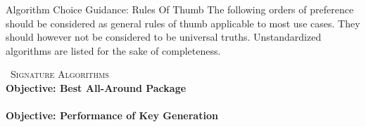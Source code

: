 


\begin{minipage}[t]{0.7\textwidth}
    \vspace{0pt}
    \begin{algorithmbox}{Algorithm Choice Guidance: Rules Of Thumb \tbv}
        {\scriptsize The following orders of preference should be considered as general rules of thumb applicable to most use cases. They should however not be considered to be universal truths. Unstandardized algorithms are listed for the sake of completeness.\\}
        \begin{minipage}[t]{0.5\textwidth}
            \vspace{0pt}
            {\scshape \faPen\, Signature Algorithms}\\
            {\scriptsize \bfseries Objective: Best All-Around Package}\\[0.1\baselineskip]
            \\[0.75\baselineskip]
            {\scriptsize \bfseries Objective: Performance of Key Generation}\\[0.1\baselineskip]
            \\[0.75\baselineskip]

\end{minipage}
\end{algorithmbox}
\end{minipage}
